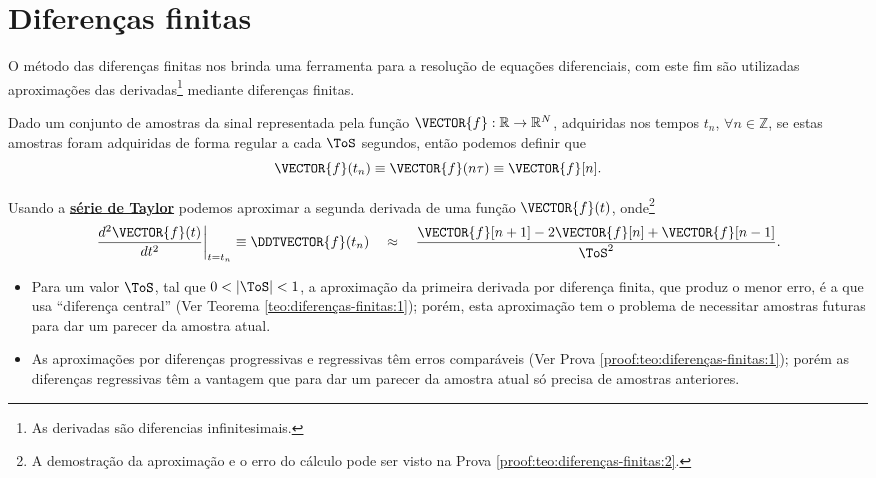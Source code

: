 \section{Diferenças finitas}

O método das diferenças finitas nos brinda uma ferramenta para a resolução de 
equações diferenciais, com este fim são utilizadas aproximações das derivadas\footnote{As 
derivadas são diferencias infinitesimais.} 
mediante diferenças finitas.

\begin{definition}
\label{def:diferenças-finitas:0}
Dado um conjunto de amostras da sinal representada pela função $\VECTOR{f}: \mathbb{R} \rightarrow \mathbb{R}^N$, 
adquiridas nos  tempos $t_n$, $\forall n \in \mathbb{Z}$, 
se estas amostras foram adquiridas de forma regular a cada $\ToS$ segundos,
então podemos definir que
\begin{equation}
\VECTOR{f}(t_n)\equiv \VECTOR{f}(n\tau) \equiv \VECTOR{f}[n].
\end{equation}
\end{definition}

\begin{theorem}
\label{teo:diferenças-finitas:2}
Usando a \hyperref[def:taylor]{\textbf{série de Taylor}} podemos aproximar 
a segunda derivada de uma função $\VECTOR{f}(t)$, onde\footnote{A
demostração da aproximação e o erro do cálculo pode ser visto na Prova \ref{proof:teo:diferenças-finitas:2}.}
\begin{equation}
\left.\frac{d^2\VECTOR{f}(t)}{dt^2}\right|_{t=t_n}\equiv \DDTVECTOR{f}(t_n)
\quad \approx \quad
\frac{\VECTOR{f}[n+1]-2\VECTOR{f}[n]+\VECTOR{f}[n-1]}{\ToS^2}.
\end{equation}
\end{theorem}

\begin{tcbattention}
\begin{itemize}
\item Para um valor $\ToS$, tal que $0<|\ToS|<1$, a aproximação da primeira derivada por diferença finita, 
que produz o menor erro, é a que usa ``diferença central'' (Ver Teorema \ref{teo:diferenças-finitas:1}); porém, 
esta aproximação tem o problema de necessitar amostras futuras para dar um parecer da amostra atual.
\item As aproximações por diferenças progressivas e regressivas têm erros comparáveis
 (Ver Prova \ref{proof:teo:diferenças-finitas:1});
porém as diferenças regressivas têm a vantagem que para dar um parecer da amostra atual só precisa de amostras anteriores.
\end{itemize}
\end{tcbattention}


